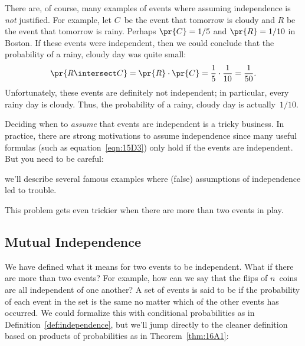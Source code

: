 There are, of course, many examples of events where assuming
independence is \emph{not} justified.  For example, let $C$~be the
event that tomorrow is cloudy and $R$ be the event that tomorrow is
rainy.  Perhaps $\pr{C} = 1/5$ and $\pr{R} = 1/10$ in Boston.  If
these events were independent, then we could conclude that the
probability of a rainy, cloudy day was quite small:
%
\begin{equation*}
\pr{R \intersect C} = \pr{R} \cdot \pr{C} %
               = \frac{1}{5} \cdot \frac{1}{10} %
               = \frac{1}{50}.
\end{equation*}
%
Unfortunately, these events are definitely not independent; in
particular, every rainy day is cloudy.  Thus, the probability of a
rainy, cloudy day is actually~$1/10$.

Deciding when to \emph{assume} that events are independent is a tricky
business.  In practice, there are strong motivations to assume
independence since many useful formulas (such as
equation~\eqref{eqn:15D3}) only hold if the events are independent.
But you need to be careful:
\iffalse
 lest you end up deriving false conclusions.
\fi
we'll describe several famous examples where (false) assumptions of
independence led to trouble.
\iffalse
 over the next several chapters
\fi
This problem gets even trickier when there are more than two events in
play.

\subsection{Mutual Independence}


We have defined what it means for two events to be independent.  What
if there are more than two events?  For example, how can we say that
the flips of $n$~coins are all independent of one another?  A set of
events is said to be  if the probability
of each event in the set is the same no matter which of the other
events has occurred.  We could formalize this with conditional
probabilities as in Definition~\ref{def:independence}, but we'll jump
directly to the cleaner definition based on products of probabilities
as in Theorem~\ref{thm:16A1}:

\iffalse

